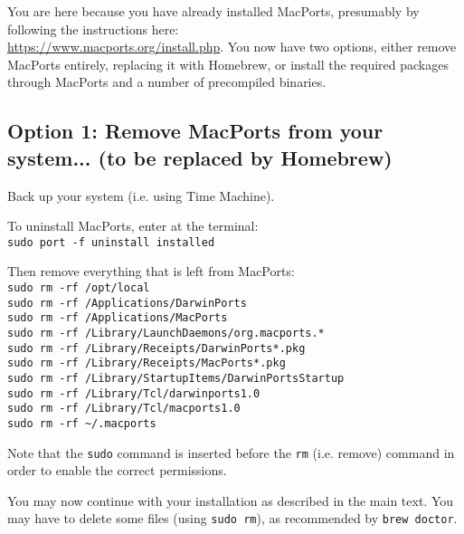 \documentclass[10pt,twoside]{article}
\begin{document}
You are here because you have already installed MacPorts, presumably by following the instructions here:
\\\href{https://www.macports.org/install.php}{https://www.macports.org/install.php}.
You now have two options, either remove MacPorts entirely, replacing it with Homebrew, or install the required packages through MacPorts and a number of precompiled binaries.

\subsection*{Option 1: Remove MacPorts from your system... (to be replaced by Homebrew)}

\begin{compactenum}

\item Back up your system (i.e. using Time Machine).

\item To uninstall MacPorts, enter at the terminal:\\
\texttt{sudo port -f uninstall installed}
 
Then remove everything that is left from MacPorts: \\
\texttt{sudo rm -rf /opt/local} \\
\texttt{sudo rm -rf /Applications/DarwinPorts} \\
\texttt{sudo rm -rf /Applications/MacPorts} \\
\texttt{sudo rm -rf /Library/LaunchDaemons/org.macports.*} \\
\texttt{sudo rm -rf /Library/Receipts/DarwinPorts*.pkg}\\
\texttt{sudo rm -rf /Library/Receipts/MacPorts*.pkg} \\
\texttt{sudo rm -rf /Library/StartupItems/DarwinPortsStartup} \\
\texttt{sudo rm -rf /Library/Tcl/darwinports1.0} \\
\texttt{sudo rm -rf /Library/Tcl/macports1.0} \\
\texttt{sudo rm -rf \textasciitilde/.macports}

Note that the \texttt{sudo} command is inserted before the \texttt{rm} (i.e. remove) command in order to enable the correct permissions.

\item You may now continue with your installation as described in the main text. You may have to delete some files (using \texttt{sudo rm}), as recommended by \texttt{brew doctor}. 

\end{compactenum}
\end{document}
